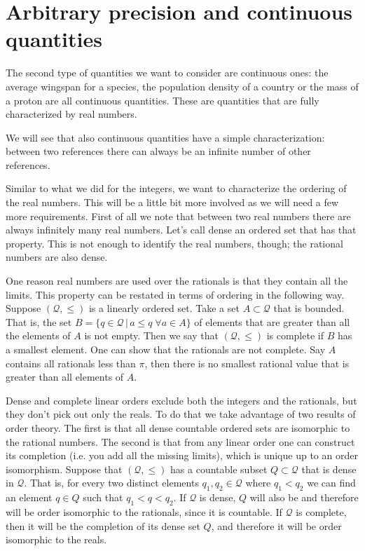 \documentclass[11pt,letterpaper,fleqn]{memoir} %
\begin{document}
\section{Arbitrary precision and continuous quantities}

The second type of quantities we want to consider are continuous ones: the average wingspan for a species, the population density of a country or the mass of a proton are all continuous quantities. These are quantities that are fully characterized by real numbers.

We will see that also continuous quantities have a simple characterization: between two references there can always be an infinite number of other references.

Similar to what we did for the integers, we want to characterize the ordering of the real numbers. This will be a little bit more involved as we will need a few more requirements. First of all we note that between two real numbers there are always infinitely many real numbers. Let's call dense an ordered set that has that property. This is not enough to identify the real numbers, though; the rational numbers are also dense.

One reason real numbers are used over the rationals is that they contain all the limits. This property can be restated in terms of ordering in the following way. Suppose $(\mathcal{Q}, \leq)$ is a linearly ordered set. Take a set $A \subset \mathcal{Q}$ that is bounded. That is, the set $B = \{ q \in \mathcal{Q} \, | \, a \leq q \; \forall a \in A  \}$ of elements that are greater than all the elements of $A$ is not empty. Then we say that $(\mathcal{Q}, \leq)$ is complete if $B$ has a smallest element. One can show that the rationals are not complete. Say $A$ contains all rationals less than $\pi$, then there is no smallest rational value that is greater than all elements of $A$.

Dense and complete linear orders exclude both the integers and the rationals, but they don't pick out only the reals. To do that we take advantage of two results of order theory. The first is that all dense countable ordered sets are isomorphic to the rational numbers. The second is that from any linear order one can construct its completion (i.e. you add all the missing limits), which is unique up to an order isomorphism. Suppose that $(\mathcal{Q}, \leq)$ has a countable subset $Q \subset \mathcal{Q}$ that is dense in $\mathcal{Q}$. That is, for every two distinct elements $q_1, q_2 \in \mathcal{Q}$ where $q_1 < q_2$ we can find an element $q \in Q$ such that $q_1 < q < q_2$. If $\mathcal{Q}$ is dense, $Q$ will also be and therefore will be order isomorphic to the rationals, since it is countable. If $\mathcal{Q}$ is complete, then it will be the completion of its dense set $Q$, and therefore it will be order isomorphic to the reals.
\end{document}
